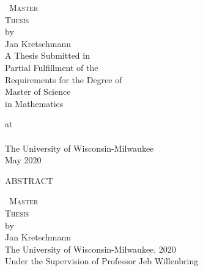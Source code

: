 \documentclass[12pt,letterpaper,oneside,openany]{book}
\newcommand{\name}{Jan Kretschmann}
\newcommand{\pglen}{390}
\newcommand{\pts}{12pt}
\newcommand{\vs}{\vspace{0.7cm}}
\newcommand{\mytitle}{\Large \textsc{\mbox{ Master}\\
  \mbox{Thesis}}\\[20pt] \normalsize by\\
  [20pt] \name  \\[\pts] \vs }
\begin{document}
\setlength{\baselineskip}{19pt}
\frontmatter




\doublespacing
{}

\pagestyle{plain}
\thispagestyle{empty}
\vs\vs 
\begin{center}
	\mytitle
	\singlespacing
	\vs
	A Thesis Submitted in \\
	Partial Fulfillment of the \\
	Requirements for the Degree of \\
	\vs \vs
	Master of Science  \\ %
	in 
	Mathematics 
	\vs \vs

	at\\
	 \ \\
	The University of Wisconsin-Milwaukee\\ 
	May 2020
\end{center}

\pagebreak



%

\begin{center} 
	{\large ABSTRACT} 
\end{center}
\begin{center}
	\mytitle  The University of Wisconsin-Milwaukee, 2020 \\
	Under the Supervision of Professor Jeb Willenbring 
\end{center}
\end{document}
